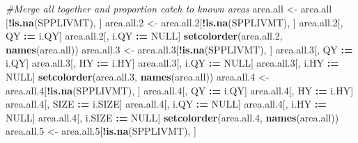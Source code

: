 \documentclass[]{article}
\newenvironment{Shaded}{\begin{snugshade}}{\end{snugshade}}
\newcommand{\KeywordTok}[1]{\textcolor[rgb]{0.13,0.29,0.53}{\textbf{#1}}}
\newcommand{\DecValTok}[1]{\textcolor[rgb]{0.00,0.00,0.81}{#1}}
\newcommand{\StringTok}[1]{\textcolor[rgb]{0.31,0.60,0.02}{#1}}
\newcommand{\CommentTok}[1]{\textcolor[rgb]{0.56,0.35,0.01}{\textit{#1}}}
\newcommand{\OtherTok}[1]{\textcolor[rgb]{0.56,0.35,0.01}{#1}}
\newcommand{\OperatorTok}[1]{\textcolor[rgb]{0.81,0.36,0.00}{\textbf{#1}}}
\newcommand{\ErrorTok}[1]{\textcolor[rgb]{0.64,0.00,0.00}{\textbf{#1}}}
\newcommand{\NormalTok}[1]{#1}
\begin{document}
\begin{Shaded}
\begin{Highlighting}[]
{{  
  \CommentTok{#Merge all together and proportion catch to known areas}
\NormalTok{  area.all   <-}\StringTok{ }\NormalTok{area.all  [}\OperatorTok{!}\KeywordTok{is.na}\NormalTok{(SPPLIVMT), ]}
\NormalTok{  area.all.}\DecValTok{2}\NormalTok{ <-}\StringTok{ }\NormalTok{area.all.}\DecValTok{2}\NormalTok{[}\OperatorTok{!}\KeywordTok{is.na}\NormalTok{(SPPLIVMT), ]}
\NormalTok{  area.all.}\DecValTok{2}\NormalTok{[, QY   }\OperatorTok{:}\ErrorTok{=}\StringTok{ }\NormalTok{i.QY]}
\NormalTok{  area.all.}\DecValTok{2}\NormalTok{[, i.QY }\OperatorTok{:}\ErrorTok{=}\StringTok{ }\OtherTok{NULL}\NormalTok{]}
  \KeywordTok{setcolorder}\NormalTok{(area.all.}\DecValTok{2}\NormalTok{, }\KeywordTok{names}\NormalTok{(area.all))}
\NormalTok{  area.all.}\DecValTok{3}\NormalTok{ <-}\StringTok{ }\NormalTok{area.all.}\DecValTok{3}\NormalTok{[}\OperatorTok{!}\KeywordTok{is.na}\NormalTok{(SPPLIVMT), ]}
\NormalTok{  area.all.}\DecValTok{3}\NormalTok{[, QY   }\OperatorTok{:}\ErrorTok{=}\StringTok{ }\NormalTok{i.QY]}
\NormalTok{  area.all.}\DecValTok{3}\NormalTok{[, HY   }\OperatorTok{:}\ErrorTok{=}\StringTok{ }\NormalTok{i.HY]}
\NormalTok{  area.all.}\DecValTok{3}\NormalTok{[, i.QY }\OperatorTok{:}\ErrorTok{=}\StringTok{ }\OtherTok{NULL}\NormalTok{]}
\NormalTok{  area.all.}\DecValTok{3}\NormalTok{[, i.HY }\OperatorTok{:}\ErrorTok{=}\StringTok{ }\OtherTok{NULL}\NormalTok{]}
  \KeywordTok{setcolorder}\NormalTok{(area.all.}\DecValTok{3}\NormalTok{, }\KeywordTok{names}\NormalTok{(area.all))}
\NormalTok{  area.all.}\DecValTok{4}\NormalTok{ <-}\StringTok{ }\NormalTok{area.all.}\DecValTok{4}\NormalTok{[}\OperatorTok{!}\KeywordTok{is.na}\NormalTok{(SPPLIVMT), ]}
\NormalTok{  area.all.}\DecValTok{4}\NormalTok{[, QY     }\OperatorTok{:}\ErrorTok{=}\StringTok{ }\NormalTok{i.QY]}
\NormalTok{  area.all.}\DecValTok{4}\NormalTok{[, HY     }\OperatorTok{:}\ErrorTok{=}\StringTok{ }\NormalTok{i.HY]}
\NormalTok{  area.all.}\DecValTok{4}\NormalTok{[, SIZE   }\OperatorTok{:}\ErrorTok{=}\StringTok{ }\NormalTok{i.SIZE]}
\NormalTok{  area.all.}\DecValTok{4}\NormalTok{[, i.QY   }\OperatorTok{:}\ErrorTok{=}\StringTok{ }\OtherTok{NULL}\NormalTok{]}
\NormalTok{  area.all.}\DecValTok{4}\NormalTok{[, i.HY   }\OperatorTok{:}\ErrorTok{=}\StringTok{ }\OtherTok{NULL}\NormalTok{]}
\NormalTok{  area.all.}\DecValTok{4}\NormalTok{[, i.SIZE }\OperatorTok{:}\ErrorTok{=}\StringTok{ }\OtherTok{NULL}\NormalTok{]}
  \KeywordTok{setcolorder}\NormalTok{(area.all.}\DecValTok{4}\NormalTok{, }\KeywordTok{names}\NormalTok{(area.all))}
\NormalTok{  area.all.}\DecValTok{5}\NormalTok{ <-}\StringTok{ }\NormalTok{area.all.}\DecValTok{5}\NormalTok{[}\OperatorTok{!}\KeywordTok{is.na}\NormalTok{(SPPLIVMT), ]}
}}
\end{Highlighting}
\end{Shaded}
\end{document}
